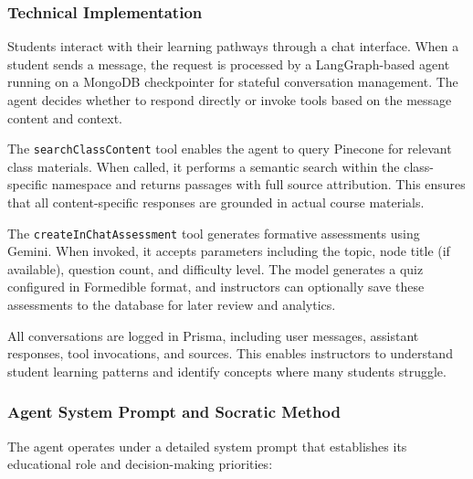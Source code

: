 \documentclass{stylefiles/capstone}
\begin{document}
\subsubsection{Technical Implementation}

Students interact with their learning pathways through a chat interface. When a student sends a message, the request is processed by a LangGraph-based agent running on a MongoDB checkpointer for stateful conversation management. The agent decides whether to respond directly or invoke tools based on the message content and context.

The \texttt{searchClassContent} tool enables the agent to query Pinecone for relevant class materials. When called, it performs a semantic search within the class-specific namespace and returns passages with full source attribution. This ensures that all content-specific responses are grounded in actual course materials.

The \texttt{createInChatAssessment} tool generates formative assessments using Gemini. When invoked, it accepts parameters including the topic, node title (if available), question count, and difficulty level. The model generates a quiz configured in Formedible format, and instructors can optionally save these assessments to the database for later review and analytics.

All conversations are logged in Prisma, including user messages, assistant responses, tool invocations, and sources. This enables instructors to understand student learning patterns and identify concepts where many students struggle.

\subsubsection{Agent System Prompt and Socratic Method}

The agent operates under a detailed system prompt that establishes its educational role and decision-making priorities:
\end{document}

